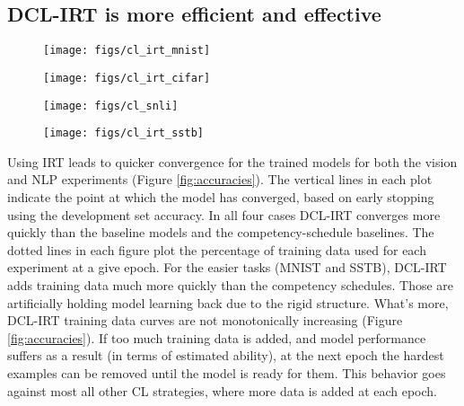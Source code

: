 \documentclass[letterpaper]{article} %
\begin{document}
\subsection{DCL-IRT is more efficient and effective}
\captionsetup[subfigure]{labelformat=empty}
\begin{figure*}[h!]
	\centering
	\begin{subfigure}[b]{0.49\textwidth}
		\centering
		\texttt{[image: figs/cl\_irt\_mnist]}
		\caption{\label{fig:cl_mnist}} 
		\vspace{-2em} 
	\end{subfigure} 
	\begin{subfigure}[b]{0.49\textwidth}
		\centering
		\texttt{[image: figs/cl\_irt\_cifar]}
		\caption{\label{fig:cl_cifar}} 
		\vspace{-2em} 
	\end{subfigure} 
	

	\begin{subfigure}[b]{0.49\textwidth}
		\centering
		\texttt{[image: figs/cl\_snli]}
		\caption{\label{fig:cl_snli}} 
		\vspace{-2em} 
	\end{subfigure} 
	\begin{subfigure}[b]{0.49\textwidth}
		\centering
		\texttt{[image: figs/cl\_irt\_sstb]}
		\caption{\label{fig:cl_sstb}} 
		\vspace{-2em} 
	\end{subfigure} 
	
	\caption{Test set accuracy as a function of training epoch.}
	\label{fig:accuracies}
\end{figure*}



Using IRT leads to quicker convergence for the trained models for both the vision and NLP experiments (Figure \ref{fig:accuracies}).
The vertical lines in each plot indicate the point at which the model has converged, based on early stopping using the development set accuracy.
In all four cases DCL-IRT converges more quickly than the baseline models and the competency-schedule baselines.
The dotted lines in each figure plot the percentage of training data used for each experiment at a give epoch.
For the easier tasks (MNIST and SSTB), DCL-IRT adds training data much more quickly than the competency schedules.
Those are artificially holding model learning back due to the rigid structure.
What's more, DCL-IRT training data curves are not monotonically increasing (Figure \ref{fig:accuracies}).
If too much training data is added, and model performance suffers as a result (in terms of estimated ability), at the next epoch the hardest examples can be removed until the model is ready for them.
This behavior goes against most all other CL strategies, where more data is added at each epoch. 
\end{document}
